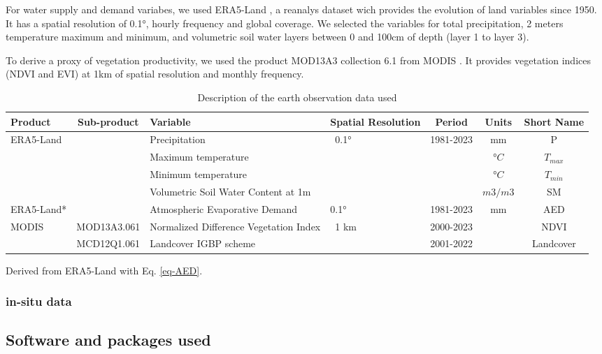 \documentclass[
  number,
  preprint,
  3p,
  onecolumn]{elsarticle}
\begin{document}
For water supply and demand variabes, we used ERA5-Land
\citep{MunozSabater2021}, a reanalys dataset wich provides the evolution
of land variables since 1950. It has a spatial resolution of 0.1°,
hourly frequency and global coverage. We selected the variables for
total precipitation, 2 meters temperature maximum and minimum, and
volumetric soil water layers between 0 and 100cm of depth (layer 1 to
layer 3).

To derive a proxy of vegetation productivity, we used the product
MOD13A3 collection 6.1 from MODIS \citep{Didan2015}. It provides
vegetation indices (NDVI and EVI) at 1km of spatial resolution and
monthly frequency.

\begin{table}[!ht]
\caption{Description of the earth observation data used }
\label{tab-desEOD}
\small
\centering
\begin{tabular}{p{}cp{}p{}ccc}
\hline
\multirow{1}{*}{\centering Product} & Sub-product & Variable & Spatial Resolution  & Period & Units & Short Name \\ 
\hline
\multirow{4}{*}{ERA5-Land} & ~ & Precipitation & \multirow{4}{*}{~0.1°} & \multirow{4}{*}{1981-2023} & mm & P \\ 
         &  & Maximum temperature & ~ & & $°C$ & $T_{max}$ \\ 
         &  & Minimum temperature & ~ & & $°C$ & $T_{min}$ \\ 
         &  & Volumetric Soil Water Content at 1m & ~ & & $m3/m3$ & SM \\ 
ERA5-Land* & & Atmospheric Evaporative Demand & 0.1° & 1981-2023 & mm & AED \\
        \multirow{2}{*}{MODIS} & MOD13A3.061 & Normalized Difference Vegetation Index & \multirow{2}{*}{~1 km} & 2000-2023 & ~ & NDVI \\ 
         & MCD12Q1.061 & Landcover IGBP scheme & & 2001-2022 & ~ & Landcover \\ 
\hline
\end{tabular}
{\raggedright *Derived from ERA5-Land with Eq. \ref{eq-AED}. \par}
\end{table}

\hypertarget{in-situ-data}{%
\subsubsection{in-situ data}\label{in-situ-data}}

\hypertarget{software-and-packages-used}{%
\subsection{Software and packages
used}\label{software-and-packages-used}}
\end{document}
